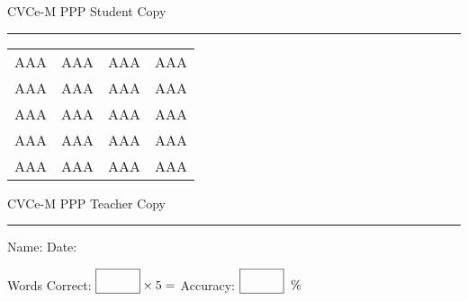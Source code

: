 \documentclass{memoir}
\begin{document}

\footnotesize \noindent
CVCe-M PPP \hfill Student Copy
\smallskip
\hrule

\Large

\setlength{\tabcolsep}{14pt}
\def\arraystretch{2}

{\selectfont


\begin{vplace}[0.5]
\begin{center}
\begin{tabular}{cccc}
AAA & AAA & AAA & AAA \\
AAA & AAA & AAA & AAA \\
AAA & AAA & AAA & AAA \\
AAA & AAA & AAA & AAA \\
AAA & AAA & AAA & AAA \\
\end{tabular}
\end{center}
\end{vplace}

}

\newpage

\footnotesize \noindent
CVCe-M PPP \hfill Teacher Copy
\smallskip
\hrule

\small

\vfill

\noindent
Name: \underline{\hspace{1.75in}} \hfill Date: \underline{\hspace{1in}}

\Large

{\selectfont



}

\small

Words Correct: $\fbox{\phantom{\huge 100}} \times 5 = $ Accuracy: $\fbox{\phantom{\huge 100}}\;\; \%$ 

\vfill

\end{document}
